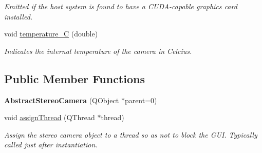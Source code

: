 \begin{DoxyCompactItemize}
\begin{DoxyCompactList}\small\item\em Emitted if the host system is found to have a C\+U\+D\+A-\/capable graphics card installed. \end{DoxyCompactList}\item 
\hypertarget{class_abstract_stereo_camera_ab661978020170e7d58906a96ec2fe61e}{}void \hyperlink{class_abstract_stereo_camera_ab661978020170e7d58906a96ec2fe61e}{temperature\+\_\+\+C} (double)\label{class_abstract_stereo_camera_ab661978020170e7d58906a96ec2fe61e}

\begin{DoxyCompactList}\small\item\em Indicates the internal temperature of the camera in Celcius. \end{DoxyCompactList}\end{DoxyCompactItemize}
\subsection*{Public Member Functions}
\begin{DoxyCompactItemize}
\item 
\hypertarget{class_abstract_stereo_camera_ac1e2dcd62f1f8b1478b16bf908ac2721}{}{\bfseries Abstract\+Stereo\+Camera} (Q\+Object $\ast$parent=0)\label{class_abstract_stereo_camera_ac1e2dcd62f1f8b1478b16bf908ac2721}

\item 
void \hyperlink{class_abstract_stereo_camera_a5496f7e9e10c2892d62091dd56709e7a}{assign\+Thread} (Q\+Thread $\ast$thread)
\begin{DoxyCompactList}\small\item\em Assign the stereo camera object to a thread so as not to block the G\+U\+I. Typically called just after instantiation. \end{DoxyCompactList}\end{DoxyCompactItemize}

